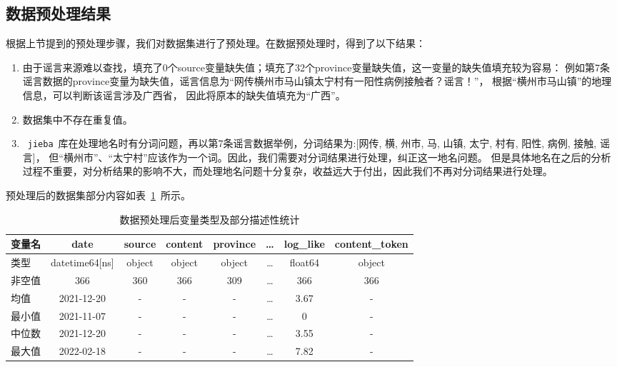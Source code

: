 \documentclass[UTF8]{ctexart}
\begin{document}
\subsection{数据预处理结果}

根据上节提到的预处理步骤，我们对数据集进行了预处理。在数据预处理时，得到了以下结果：
\begin{enumerate}
    \item 由于谣言来源难以查找，填充了0个source变量缺失值；填充了32个province变量缺失值，这一变量的缺失值填充较为容易：
    例如第7条谣言数据的province变量为缺失值，谣言信息为“网传横州市马山镇太宁村有一阳性病例接触者？谣言！”，
    根据“横州市马山镇”的地理信息，可以判断该谣言涉及广西省，
    因此将原本的缺失值填充为“广西”。
    \item 数据集中不存在重复值。
    \item ~\verb|jieba|~库在处理地名时有分词问题，再以第7条谣言数据举例，分词结果为:[网传, 横, 州市, 马, 山镇, 太宁, 村有, 阳性, 病例, 接触, 谣言]，
    但“横州市”、“太宁村”应该作为一个词。因此，我们需要对分词结果进行处理，纠正这一地名问题。
    但是具体地名在之后的分析过程不重要，对分析结果的影响不大，而处理地名问题十分复杂，收益远大于付出，因此我们不再对分词结果进行处理。
\end{enumerate}

预处理后的数据集部分内容如表~\ref{tab:预处理后数据集变量类型、部分描述性}~所示。

\begin{table}[!ht] \centering
    \begin{tabularx}{\linewidth}{X c c c c c c c}
        \toprule
        变量名 & date & source & content & province & \dots & log\_like & content\_token \\
        \midrule
        类型 & datetime64[ns] & object & object & object & \dots & float64 & object \\
        非空值 & 366 & 360 & 366 & 309 & \dots & 366 & 366 \\
        均值 & 2021-12-20 & - & - & - & \dots & 3.67 & - \\
        最小值 & 2021-11-07 & - & - & - & \dots & 0 & -\\
        中位数 & 2021-12-20 & - & - & - & \dots & 3.55 & -\\
        最大值 & 2022-02-18 & - & - & - & \dots & 7.82 & -\\
        \bottomrule
    \end{tabularx}
    \caption{数据预处理后变量类型及部分描述性统计}
    \label{tab:预处理后数据集变量类型、部分描述性}
\end{table}
\end{document}

